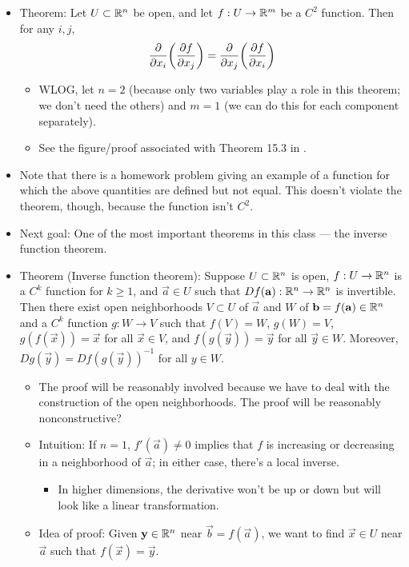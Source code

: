 \documentclass[../notes.tex]{subfiles}
\begin{document}
\begin{itemize}
    \item {}Theorem: Let $U\subset\mathbb{R}^n$ be open, and let $f:U\to\mathbb{R}^m$ be a $C^2$ function. Then for any $i,j$,
    \begin{equation*}
        \pdv{x_i}(\pdv{f}{x_j}) = \pdv{x_j}(\pdv{f}{x_i})
    \end{equation*}
    \begin{itemize}
        \item WLOG, let $n=2$ (because only two variables play a role in this theorem; we don't need the others) and $m=1$ (we can do this for each component separately).
        \item See the figure/proof associated with Theorem 15.3 in \textcite{bib:CAAGThomasNotes}.
    \end{itemize}
    \item Note that there is a homework problem giving an example of a function for which the above quantities are defined but not equal. This doesn't violate the theorem, though, because the function isn't $C^2$.
    \item Next goal: One of the most important theorems in this class --- the inverse function theorem.
    \item Theorem (Inverse function theorem): Suppose $U\subset\mathbb{R}^n$ is open, $f:U\to\mathbb{R}^n$ is a $C^k$ function for $k\geq 1$, and $\vec{a}\in U$ such that $Df(\mathbf{a}):\mathbb{R}^n\to\mathbb{R}^n$ is invertible. Then there exist open neighborhoods $V\subset U$ of $\vec{a}$ and $W$ of $\mathbf{b}=f(\mathbf{a})\in\mathbb{R}^n$ and a $C^k$ function $g:W\to V$ such that $f(V)=W$, $g(W)=V$, $g(f(\vec{x}))=\vec{x}$ for all $\vec{x}\in V$, and $f(g(\vec{y}))=\vec{y}$ for all $\vec{y}\in W$. Moreover, $Dg(\vec{y})=Df(g(\vec{y}))^{-1}$ for all $y\in W$.
    \begin{itemize}
        \item The proof will be reasonably involved because we have to deal with the construction of the open neighborhoods. The proof will be reasonably nonconstructive?
        \item Intuition: If $n=1$, $f'(\vec{a})\neq 0$ implies that $f$ is increasing or decreasing in a neighborhood of $\vec{a}$; in either case, there's a local inverse.
        \begin{itemize}
            \item In higher dimensions, the derivative won't be up or down but will look like a linear transformation.
        \end{itemize}
        \item Idea of proof: Given $\mathbf{y}\in\mathbb{R}^n$ near $\vec{b}=f(\vec{a})$, we want to find $\vec{x}\in U$ near $\vec{a}$ such that $f(\vec{x})=\vec{y}$.

\end{itemize}
\end{itemize}
\end{document}
